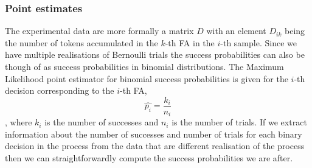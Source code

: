 \subsubsection{Point estimates}
The experimental data are more formally a matrix $D$ with an element $D_{ik}$ being
the number of tokens accumulated in the $k$-th FA in the $i$-th
sample. Since we have multiple
realisations of Bernoulli trials the success probabilities can also be
though of as success probabilities in binomial distributions. The
Maximum Likelihood point estimator for binomial success probabilities
is given for the $i$-th decision corresponding to the $i$-th FA,
\begin{equation*}
\hat{p_i} = \frac{k_i}{n_i}
\end{equation*}
, where $k_i$ is the number of successes and $n_i$ is the number of
trials. If we extract information about the number of successes and
number of trials for each binary decision in the process from the data
that are different realisation of the process then we can
straightforwardly compute the success probabilities we are after.

